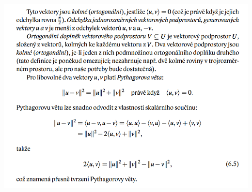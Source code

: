 \documentclass[12pt,a4paper]{article}
\begin{document}
\begin{center}
	\includegraphics[scale=0.5]{img/EukleidovskeProstory4}
\end{center}
\end{document}
